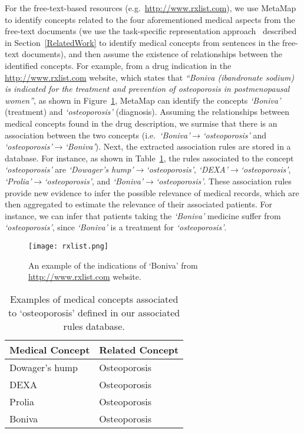 \documentclass[1p]{elsarticle}
\begin{document}
For the free-text-based resources (e.g.\ \url{http://www.rxlist.com}), we use Meta\-Map to identify concepts related to the four aforementioned medical aspects from the free-text documents (we use the task-specific representation approach~\cite{limsopatham2013ecir-b} described in Section~\ref{RelatedWork} to identify medical concepts from sentences in the free-text documents), and then assume the existence of relationships between the identified concepts.
For example, from a drug indication in the \url{http://www.rxlist.com} website, which states that \emph{``Boniva (ibandronate sodium) is indicated for the treatment and prevention of osteoporosis in postmenopausal women''}, as shown in Figure~\ref{fig:rxlist},
MetaMap can identify the concepts \emph{`Boniva'} (treatment) and \emph{`osteoporosis'} (diagnosis). Assuming the relationships between medical concepts found in the drug description, we surmise that there is an association between the two concepts (i.e.\ \emph{`Boniva'$\rightarrow$`osteoporosis'} and \emph{`osteoporosis'$\rightarrow$`Boniva'}). Next, the extracted association rules are stored in a database. For instance, as shown in Table~\ref{tab:reasoning}, the rules associated to the concept \emph{`osteoporosis'} are \emph{`Dowager's hump'$\rightarrow$`os\-teoporosis'}, \emph{`DEXA'$\rightarrow$`os\-teoporosis'}, \emph{`Prolia'}\emph{$\rightarrow$`os\-teo\-porosis'}, and \emph{`Boniva'$\rightarrow$`os\-teo\-poro\-sis'}.
These association rules provide new evidence to infer the possible relevance of medical records, which are then aggregated to estimate the relevance of their associated patients. For instance, we can infer that patients taking the \emph{`Boniva'} medicine suffer from \emph{`osteoporosis'}, since \emph{`Boniva'} is a treatment for \emph{`osteoporosis'}.

\begin{figure}[tb]
  \centering
\texttt{[image: rxlist.png]}
\caption{An example of the indications of `Boniva' from \protect\url{http://www.rxlist.com} website.}\label{fig:rxlist}
\end{figure}

\begin{table}[tb]
\caption{Examples of medical concepts associated to `osteoporosis' defined in our associated rules database.}\label{tab:reasoning}
  \centering
\begin{tabular}{|l|l|}
    \hline
    Medical Concept & Related Concept\\ \hline
    Dowager's hump & Osteoporosis\\ 
    DEXA & Osteoporosis\\ 
    Prolia & Osteoporosis\\ 
    Boniva & Osteoporosis\\ \hline
  \end{tabular}   
\end{table}
\end{document}
